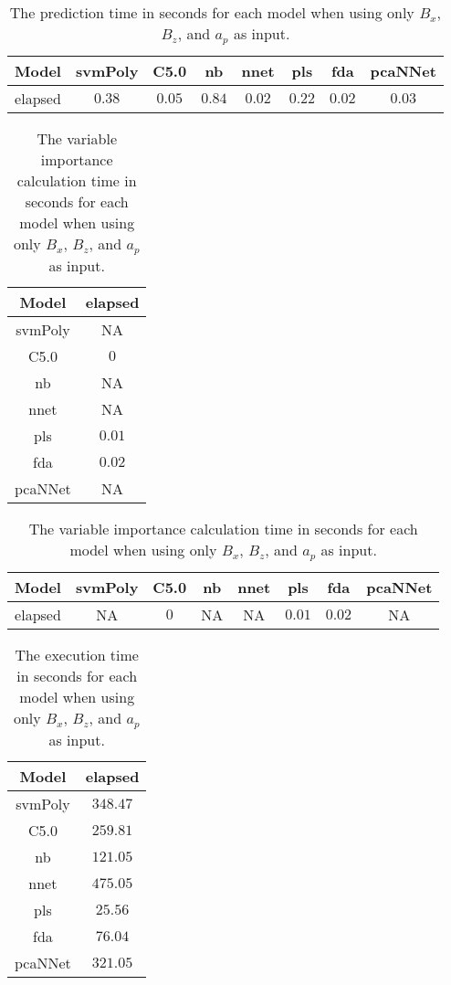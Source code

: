 \begin{table}[!ht]
	\centering
	\begin{tabular}{|c|c|c|c|c|c|c|c|}
		\hline
		Model & svmPoly & C5.0 & nb & nnet & pls & fda & pcaNNet \\ \hline
		elapsed & $0.38$ & $0.05$ & $0.84$ & $0.02$ & $0.22$ & $0.02$ & $0.03$ \\ \hline
	\end{tabular}
	\caption{The prediction time in seconds for each model when using only $B_{x}$, $B_{z}$, and $a_{p}$ as input.}
	\label{tab:time:reverse:xzap:predict}
\end{table}

\begin{table}[!ht]
	\centering
	\begin{tabular}{|c|c|}
		\hline
		Model & elapsed \\ \hline
		svmPoly & NA \\ \hline
		C5.0 & $0$ \\ \hline
		nb & NA \\ \hline
		nnet & NA \\ \hline
		pls & $0.01$ \\ \hline
		fda & $0.02$ \\ \hline
		pcaNNet & NA \\ \hline
	\end{tabular}
	\caption{The variable importance calculation time in seconds for each model when using only $B_{x}$, $B_{z}$, and $a_{p}$ as input.}
	\label{tab:time:xzap:importance}
\end{table}

\begin{table}[!ht]
	\centering
	\begin{tabular}{|c|c|c|c|c|c|c|c|}
		\hline
		Model & svmPoly & C5.0 & nb & nnet & pls & fda & pcaNNet \\ \hline
		elapsed & NA & $0$ & NA & NA & $0.01$ & $0.02$ & NA \\ \hline
	\end{tabular}
	\caption{The variable importance calculation time in seconds for each model when using only $B_{x}$, $B_{z}$, and $a_{p}$ as input.}
	\label{tab:time:reverse:xzap:importance}
\end{table}

\begin{table}[!ht]
	\centering
	\begin{tabular}{|c|c|}
		\hline
		Model & elapsed \\ \hline
		svmPoly & $348.47$ \\ \hline
		C5.0 & $259.81$ \\ \hline
		nb & $121.05$ \\ \hline
		nnet & $475.05$ \\ \hline
		pls & $25.56$ \\ \hline
		fda & $76.04$ \\ \hline
		pcaNNet & $321.05$ \\ \hline
	\end{tabular}
	\caption{The execution time in seconds for each model when using only $B_{x}$, $B_{z}$, and $a_{p}$ as input.}
	\label{tab:time:xzap:total}
\end{table}


